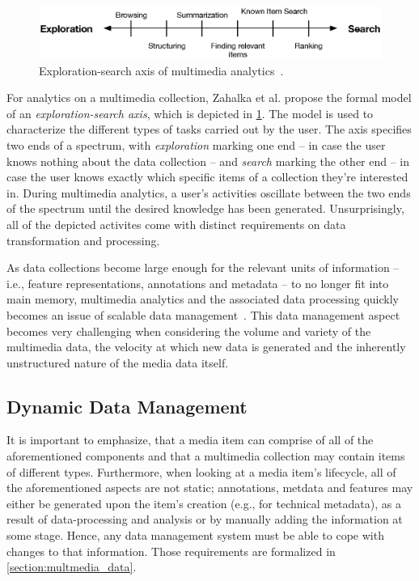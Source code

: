 \begin{figure}[h]
    \centering
    \includegraphics[width=\textwidth]{figures/exploration_search_axis.eps}
    \caption{Exploration-search axis of multimedia analytics~\cite{Zahalka:2014towards}.}
    \label{figure:exploration-search-axis}
\end{figure}

For analytics on a multimedia collection, Zahalka et al. \cite{Zahalka:2014towards} propose the formal model of an \emph{exploration-search axis}, which is depicted in \cref{figure:exploration-search-axis}. The model is used to characterize the different types of tasks carried out by the user. The axis specifies two ends of a spectrum, with \emph{exploration} marking one end -- in case the user knows nothing about the data collection -- and \emph{search} marking the other end -- in case the user knows exactly which specific items of a collection they're interested in. During multimedia analytics, a user's activities oscillate between the two ends of the spectrum until the desired knowledge has been generated. Unsurprisingly, all of the depicted activites come with distinct requirements on data transformation and processing.

As data collections become large enough for the relevant units of information -- i.e., feature representations, annotations and metadata -- to no longer fit into main memory, multimedia analytics and the associated data processing quickly becomes an issue of scalable data management~\cite{Jonson:2016}. This data management aspect becomes very challenging when considering the volume and variety of the multimedia data, the velocity at which new data is generated and the inherently unstructured nature of the media data itself.

\subsection{Dynamic Data Management}


It is important to emphasize, that a media item can comprise of all of the aforementioned components and that a multimedia collection may contain items of different types. Furthermore, when looking at a media item's lifecycle, all of the aforementioned aspects are not static; annotations, metdata and features may either be generated upon the item's creation (e.g., for technical metadata), as a result of data-processing and analysis or by manually adding the information at some stage. Hence, any data management system must be able to cope with changes to that information. Those requirements are formalized in \cref{section:multmedia_data}.


